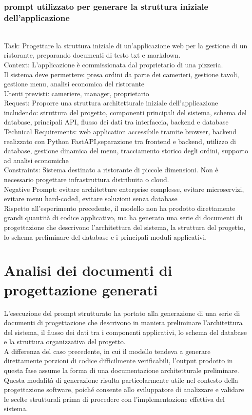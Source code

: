 \subsubsection{prompt utilizzato per generare la struttura iniziale dell'applicazione}
\\
Task: Progettare la struttura iniziale di un'applicazione web per la gestione
di un ristorante, preparando documenti di testo txt e markdown.
\\
Context:
L'applicazione è commissionata dal proprietario di una pizzeria.
\\
Il sistema deve permettere:
presa ordini da parte dei camerieri, gestione tavoli, gestione menu, analisi economica del ristorante
\\
Utenti previsti: cameriere, manager, proprietario
\\
Request:
Proporre una struttura architetturale iniziale dell'applicazione includendo: struttura del progetto, componenti principali del sistema, schema del database, principali API, flusso dei dati tra interfaccia, backend e database
\\
Technical Requirements:
web application accessibile tramite browser, backend realizzato con Python FastAPI,separazione tra frontend e backend, utilizzo di database, gestione dinamica del menu, tracciamento storico degli ordini, supporto ad analisi economiche
\\
Constraints:
Sistema destinato a ristorante di piccole dimensioni.
Non è necessario progettare infrastruttura distribuita o cloud.
\\
Negative Prompt:
evitare architetture enterprise complesse, evitare microservizi, evitare menu hard-coded, evitare soluzioni senza database
\\
Rispetto all'esperimento precedente, il modello non ha prodotto direttamente grandi quantità di codice applicativo, ma ha generato una serie di documenti di progettazione che descrivono l'architettura del sistema, la struttura del progetto, lo schema preliminare del database e i principali moduli applicativi.

\section{Analisi dei documenti di progettazione generati}

L'esecuzione del prompt strutturato ha portato alla generazione di una serie di documenti di progettazione che descrivono in maniera preliminare l'architettura del sistema, il flusso dei dati tra i componenti applicativi, lo schema del database e la struttura organizzativa del progetto.
\\
A differenza del caso precedente, in cui il modello tendeva a generare direttamente porzioni di codice difficilmente verificabili, l'output prodotto in questa fase assume la forma di una documentazione architetturale preliminare. Questa modalità di generazione risulta particolarmente utile nel contesto della progettazione software, poiché consente allo sviluppatore di analizzare e validare le scelte strutturali prima di procedere con l'implementazione effettiva del sistema.

